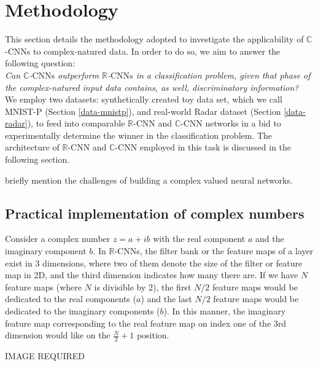 \chapter{Methodology} \label{chap:methodology}
 
This section details the methodology adopted to investigate the applicability of $\mathbb{C}$-CNNs to complex-natured data. In order to do so, we aim to answer the following question:\\
 
 \textit{Can $\mathbb{C}$-$\mathrm{CNNs}$ outperform $\mathbb{R}$-$\mathrm{CNNs}$ in a classification problem, given that phase of the complex-natured input data contains, as well, discriminatory information?}\\
 
 We employ two datasets: synthetically created toy data set, which we call MNIST-P (Section \ref{data-mnistp}), and real-world Radar dataset (Section \ref{data-radar}), to feed into comparable $\mathbb{R}$-CNN and $\mathbb{C}$-CNN networks in a bid to experimentally determine the winner in the classification problem. The architecture of $\mathbb{R}$-CNN and $\mathbb{C}$-CNN employed in this task is discussed in the following section.
 

 
 
 
 
 briefly mention the challenges of building a complex valued neural networks. 
 
 

   
 \section{Practical implementation of complex numbers}
 Consider a complex number $z=a+ib$ with the real component $a$ and the imaginary component $b$. In $\mathbb{R}$-CNNs, the filter bank or the feature maps of a layer exist in 3 dimensions, where two of them denote the size of the filter or feature map in 2D, and the third dimension indicates how many there are. If we have $N$ feature maps (where $N$ is divisible by 2), the first $N/2$ feature maps would be dedicated to the real components ($a$) and the last $N/2$ feature maps would be dedicated to the imaginary components ($b$). In this manner, the imaginary feature map corresponding to the real feature map on index one of the 3rd dimension would like on the $\frac{N}{2} +1$ position.
 
 IMAGE REQUIRED
 
 
 
